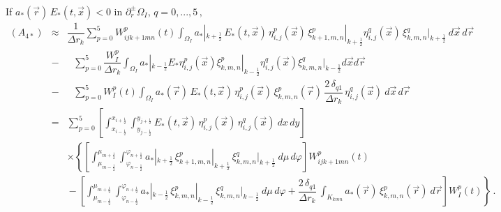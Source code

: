 \documentclass[11pt]{article}
\newcommand{\ot}{\frac{1}{2}}
\begin{document}
\ \\
If $a_{*}(\vec{r}) \, E_{*}(t,\vec{x}) < 0$ in $\partial^{\pm}_r \Omega_{I}$,  
 $q = 0, ...,5 \, ,$
%
{\small
\begin{eqnarray*}
(A_{4*})
& \approx &
\dfrac{1}{\Delta r_{k}}
\sum_{p=0}^{5} W_{ijk+1 mn}^p(t)
\int_{\Omega_{I}}
a_{*}|_{k + \ot} \, E_{*}(t,\vec{x}) \, \eta^{p}_{i,j}(\vec{x}) \,
 \xi^{p}_{k+1,m,n}|_{k + \ot}
\eta^{q}_{i,j}(\vec{x}) \, \xi^{q}_{k,m,n}|_{k + \ot} \:
d\vec{x} \, d\vec{r} 
\\
& - &
\mbox{ } %
\sum_{p=0}^{5}  
\dfrac{W^p_{I}}{\Delta r_{k}}
\int_{\Omega_{I}} %
a_{*}|_{k - \ot} E_{*}%
\eta^{p}_{i,j}(\vec{x})  
\xi^{p}_{k,m,n}|_{k - \ot} 
\eta^{q}_{i,j}(\vec{x}) \xi^{q}_{k,m,n}|_{k - \ot} 
d\vec{x} d\vec{r}
\\
& - &
\mbox{ } %
\sum_{p=0}^{5} W_{I}^p (t)
\int_{\Omega_{I}}
a_{*}(\vec{r}) \, E_{*}(t,\vec{x}) \, \eta^{p}_{i,j}(\vec{x}) \, \xi^{p}_{k,m,n}(\vec{r})
\, \dfrac{2 \, \delta_{q1}}{\Delta r_{k}} \, \eta^{q}_{i,j}(\vec{x}) \:
d\vec{x} \, d\vec{r} 
\\
%
%
& = &  \sum_{p=0}^{5} 
\left[ 
\int_{x_{i - \ot}}^{x_{i + \ot}} 
\int_{y_{j - \ot}}^{y_{j + \ot}} 
E_{*}(t,\vec{x}) \, \eta^{p}_{i,j}(\vec{x}) \, \eta^{q}_{i,j}(\vec{x}) \:dx \, dy
\right]  
\\
& & %
\times
\left\lbrace
\left[ %
\int_{\mu_{m - \ot}}^{\mu_{m + \ot}}  
\int_{\varphi_{n - \ot}}^{\varphi_{n + \ot}} 
a_{*}|_{k + \ot} \, \xi^{p}_{k+1,m,n}|_{k + \ot} \, 
\xi^{q}_{k,m,n}|_{k + \ot} \: d\mu \, d\varphi %
\right]
W_{ijk+1 mn}^p(t)
\right.
\\
& & \mbox{} %
- \left[ %
\int_{\mu_{m - \ot}}^{\mu_{m + \ot}} 
\int_{\varphi_{n - \ot}}^{\varphi_{n + \ot}} 
a_{*}|_{k - \ot} \, \xi^{p}_{k,m,n}|_{k - \ot} \, 
\xi^{q}_{k,m,n}|_{k - \ot} \: d\mu \, d\varphi %
\right. 
\left. \left. \mbox{} %
+
\dfrac{2 \, \delta_{q1}}{\Delta r_{k}} \,  \int_{K_{kmn}}
a_{*}(\vec{r}) \,  \xi^{p}_{k,m,n}(\vec{r}) \: d\vec{r}  %
\right] 
W_{I}^p (t)
\right\rbrace \, .
\end{eqnarray*}
}
%
\end{document}
